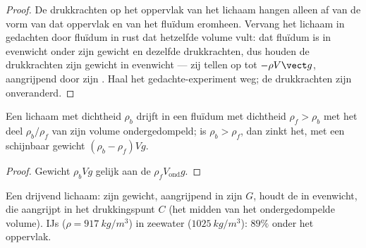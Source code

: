 \begin{proof}
De drukkrachten op het oppervlak van het lichaam hangen alleen af van de vorm van
dat oppervlak en van het fluïdum eromheen. Vervang het lichaam in gedachten door
fluïdum in rust dat hetzelfde volume vult: dat fluïdum is in evenwicht
onder zijn gewicht en dezelfde drukkrachten, dus houden de drukkrachten
zijn gewicht in evenwicht --- zij tellen op tot $-\rho V\vect g$, aangrijpend door zijn
. Haal het gedachte-experiment weg; de drukkrachten zijn
onveranderd.
\end{proof}

\begin{corollary}[Drijven]\label{cor:b1:fluid-statics:floating}
Een lichaam met dichtheid $\rho_b$ drijft in een fluïdum met dichtheid $\rho_f > \rho_b$
met het deel $\rho_b/\rho_f$ van zijn volume ondergedompeld; is $\rho_b >
\rho_f$, dan zinkt het, met een schijnbaar gewicht $(\rho_b - \rho_f)Vg$.
\end{corollary}

\begin{proof}
Gewicht $\rho_bVg$ gelijk aan de  $\rho_fV_{\text{ond}}g$.
\end{proof}

\begin{omfigure}

{\small Een drijvend lichaam: zijn gewicht, aangrijpend in zijn  $G$,
houdt de  in evenwicht, die aangrijpt in het drukkingspunt $C$ (het
midden van het ondergedompelde volume). IJs ($\rho = \qty{917}{kg/m^3}$) in
zeewater ($\qty{1025}{kg/m^3}$): $89\%$ onder het oppervlak.}
\end{omfigure}

